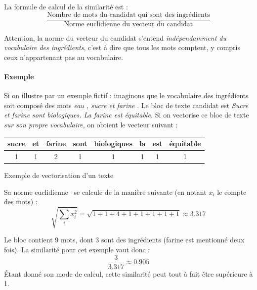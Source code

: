                 La formule de calcul de la similarité est :
                \[\frac{\text{Nombre de mots du candidat qui sont des ingrédients}}{\text{Norme euclidienne du vecteur du candidat}}\]
                
                Attention, la norme du vecteur du candidat s'entend \emph{indépendamment du vocabulaire des ingrédients}, c'est à dire que tous les mots comptent, y compris ceux n'appartenant pas au vocabulaire.

                \paragraph{Exemple}
                Si on illustre par un exemple fictif : imaginons que le vocabulaire des ingrédients soit composé des mots \emph{\og eau \fg, \og sucre \fg et \og farine \fg}.
                Le bloc de texte candidat est \emph{\og Sucre et farine sont biologiques. La farine est équitable.\fg}
                Si on vectorise ce bloc de texte \emph{sur son propre vocabulaire}, on obtient le vecteur suivant : 

                \bigskip
                \begin{minipage}{\textwidth}
                \captionsetup{type=table}
                \centering
                \begin{tabular}{cccccccc}
                    \toprule
                    sucre & et & farine & sont & biologiques & la & est & équitable \\
                    \midrule
                    1 & 1 & 2 & 1 & 1 & 1 & 1 & 1 \\
                    \bottomrule
                \end{tabular}
                \caption{Exemple de vectorisation d'un texte}
                \bigskip
                \end{minipage}                

                Sa norme euclidienne~\cite{norm_wiki} se calcule de la manière suivante (en notant $x_{i}$ le compte des mots) : 
                \[\sqrt{\sum_{i}^{} x_{i}^{2}} = \sqrt{1 + 1 + 4 + 1 + 1 + 1 + 1 + 1} \approx 3.317\]

                Le bloc contient 9 mots, dont 3 sont des ingrédients (\og farine \fg est mentionné deux fois). La similarité pour cet exemple vaut donc :
                \[\frac{3}{3.317} \approx 0.905\]
                \'{E}tant donné son mode de calcul, cette similarité peut tout à fait être supérieure à 1.

